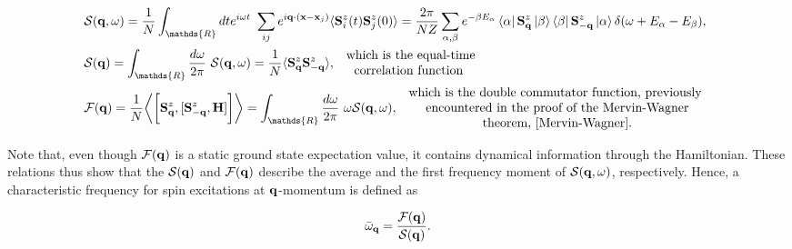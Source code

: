 \documentclass{homework}
\begin{document}
\begin{equation}
\begin{split}
    &\mathcal{S}({\bf q}, \omega) = \frac{1}{N} \int_{\mathds{R}} dt e^{i \omega t} \blanky \sum_{ij} e^{i {\bf q} \cdot ({\bf x} - {\bf x}_j)} \langle \spin_i^z(t) \spin_j^z(0) \rangle = \frac{2\pi}{NZ} \sum_{\alpha, \beta} e^{-\beta E_{\alpha}} \bra{\alpha} \spin_{{\bf q}}^z \ket{\beta} \bra{\beta} \spin^z_{-{\bf q}} \ket{\alpha} \delta(\omega + E_{\alpha} - E_{\beta}), \\
    &\mathcal{S}({\bf q}) = \int_{\mathds{R}} \frac{d\omega}{2\pi} \blanky \mathcal{S}({\bf q}, \omega) = \frac{1}{N} \langle \spin_{{\bf q}}^z \spin_{-{\bf q}}^z \rangle,  \begin{array}{c}
         \textnormal{ which is the equal-time}  \\
         \textnormal{ correlation function }
    \end{array} \\
    &\mathcal{F}({\bf q}) = \frac{1}{N} \bigg \langle \bigg[\spin_{{\bf q}}^z, [\spin_{-{\bf q}}^z, {\bf H}]\bigg] \bigg \rangle = \int_{\mathds{R}} \frac{d\omega}{2\pi} \blanky \omega \mathcal{S}({\bf q}, \omega), \begin{array}{cc}
         \textnormal{ which is the double commutator function, previously } \\
         \textnormal{  encountered in the proof of the Mervin-Wagner} \\
         \textnormal{ theorem,  \cref{Mervin-Wagner}.}
    \end{array}
    \label{Goldstone_spin_dynamical_factors}
\end{split}
\end{equation}

Note that, even though $\mathcal{F}({\bf q})$ is a static ground state expectation value, it contains dynamical information through the Hamiltonian. These relations thus show that the $\mathcal{S}({\bf q})$ and $\mathcal{F}({\bf q})$ describe the average and the first frequency moment of $\mathcal{S}({\bf q}, \omega)$, respectively. Hence, a characteristic frequency for spin excitations at ${\bf q}$-momentum is defined as 

\begin{equation}
    \bar{\omega}_{{\bf q}} = \frac{\mathcal{F}({\bf q})}{\mathcal{S}({\bf q})}. 
    \label{Goldstone_char_freq}
\end{equation}

\blanky \\
\end{document}
